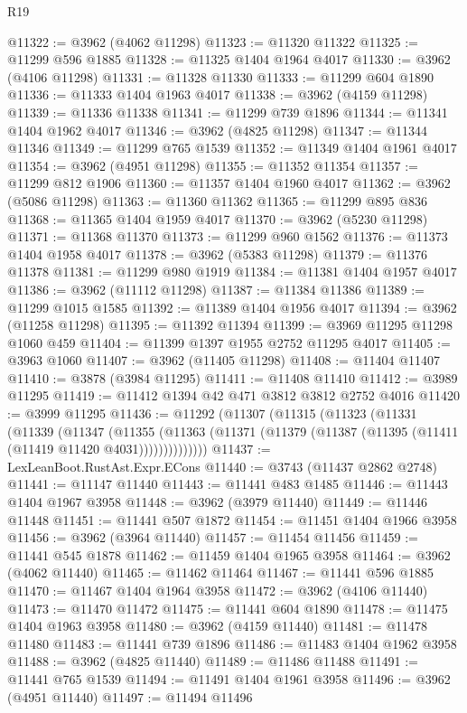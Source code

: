 \begin{lexlean}{R19}
\begin{coremodule}
@11322 := @3962 (@4062 @11298)
@11323 := @11320 @11322
@11325 := @11299 @596 @1885
@11328 := @11325 @1404 @1964 @4017
@11330 := @3962 (@4106 @11298)
@11331 := @11328 @11330
@11333 := @11299 @604 @1890
@11336 := @11333 @1404 @1963 @4017
@11338 := @3962 (@4159 @11298)
@11339 := @11336 @11338
@11341 := @11299 @739 @1896
@11344 := @11341 @1404 @1962 @4017
@11346 := @3962 (@4825 @11298)
@11347 := @11344 @11346
@11349 := @11299 @765 @1539
@11352 := @11349 @1404 @1961 @4017
@11354 := @3962 (@4951 @11298)
@11355 := @11352 @11354
@11357 := @11299 @812 @1906
@11360 := @11357 @1404 @1960 @4017
@11362 := @3962 (@5086 @11298)
@11363 := @11360 @11362
@11365 := @11299 @895 @836
@11368 := @11365 @1404 @1959 @4017
@11370 := @3962 (@5230 @11298)
@11371 := @11368 @11370
@11373 := @11299 @960 @1562
@11376 := @11373 @1404 @1958 @4017
@11378 := @3962 (@5383 @11298)
@11379 := @11376 @11378
@11381 := @11299 @980 @1919
@11384 := @11381 @1404 @1957 @4017
@11386 := @3962 (@11112 @11298)
@11387 := @11384 @11386
@11389 := @11299 @1015 @1585
@11392 := @11389 @1404 @1956 @4017
@11394 := @3962 (@11258 @11298)
@11395 := @11392 @11394
@11399 := @3969 @11295 @11298 @1060 @459
@11404 := @11399 @1397 @1955 @2752 @11295 @4017
@11405 := @3963 @1060
@11407 := @3962 (@11405 @11298)
@11408 := @11404 @11407
@11410 := @3878 (@3984 @11295)
@11411 := @11408 @11410
@11412 := @3989 @11295
@11419 := @11412 @1394 @42 @471 @3812 @3812 @2752 @4016
@11420 := @3999 @11295
@11436 := @11292
    (@11307
      (@11315
        (@11323
          (@11331
            (@11339
              (@11347
                (@11355
                  (@11363 (@11371 (@11379 (@11387 (@11395 (@11411 (@11419 @11420 @4031))))))))))))))
@11437 := LexLeanBoot.RustAst.Expr.ECons
@11440 := @3743 (@11437 @2862 @2748)
@11441 := @11147 @11440
@11443 := @11441 @483 @1485
@11446 := @11443 @1404 @1967 @3958
@11448 := @3962 (@3979 @11440)
@11449 := @11446 @11448
@11451 := @11441 @507 @1872
@11454 := @11451 @1404 @1966 @3958
@11456 := @3962 (@3964 @11440)
@11457 := @11454 @11456
@11459 := @11441 @545 @1878
@11462 := @11459 @1404 @1965 @3958
@11464 := @3962 (@4062 @11440)
@11465 := @11462 @11464
@11467 := @11441 @596 @1885
@11470 := @11467 @1404 @1964 @3958
@11472 := @3962 (@4106 @11440)
@11473 := @11470 @11472
@11475 := @11441 @604 @1890
@11478 := @11475 @1404 @1963 @3958
@11480 := @3962 (@4159 @11440)
@11481 := @11478 @11480
@11483 := @11441 @739 @1896
@11486 := @11483 @1404 @1962 @3958
@11488 := @3962 (@4825 @11440)
@11489 := @11486 @11488
@11491 := @11441 @765 @1539
@11494 := @11491 @1404 @1961 @3958
@11496 := @3962 (@4951 @11440)
@11497 := @11494 @11496

\end{coremodule}
\end{lexlean}
